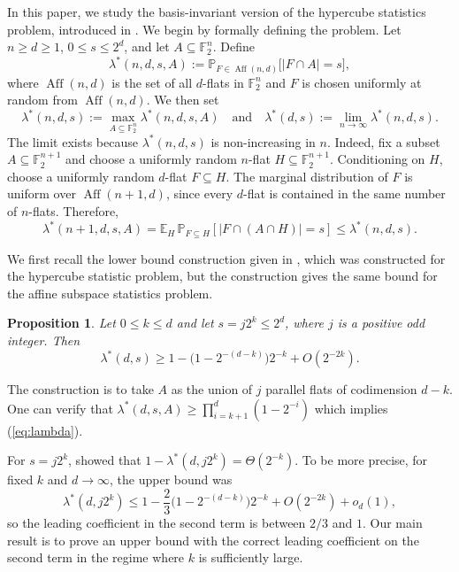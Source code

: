 \documentclass[reqno]{amsart}
\newtheorem{proposition}[theorem]{Proposition}
\theoremstyle{definition}
\theoremstyle{remark}
\newcommand{\F}{\mathbb F}
\newcommand{\E}{\mathbb E}
\renewcommand{\P}{\mathbb P}
\DeclareMathOperator{\Aff}{Aff}
\begin{document}
In this paper, we study the basis-invariant version of the hypercube statistics problem, introduced in \cite{Xu2026}. We begin by formally defining the problem. Let $n\ge d\ge1$, $0\le s\le2^d$, and
let $A\subseteq\F_2^n$. Define
\[\lambda^*(n,d,s,A):=\P_{F\in\Aff(n,d)}\bigl[|F\cap A|=s\bigr],\]
where $\Aff(n,d)$ is the set of all $d$-flats in $\F_2^{n}$ and $F$ is chosen uniformly at random from $\Aff(n,d)$. We then set
\[\lambda^*(n,d,s):=\max_{A\subseteq\F_2^n}\lambda^*(n,d,s,A)\quad\text{and}\quad \lambda^*(d,s):=\lim_{n\to\infty}\lambda^*(n,d,s).\]
The limit exists because $\lambda^*(n,d,s)$ is non-increasing in $n$. Indeed, fix a subset $A\subseteq\F_2^{n+1}$ and choose a uniformly random $n$-flat $H\subseteq\F_2^{n+1}$. Conditioning on $H$, choose a uniformly
random $d$-flat $F\subseteq H$. The marginal distribution of $F$ is uniform over $\Aff(n+1,d)$, since every $d$-flat is contained in the same
number of $n$-flats. Therefore,
\[\lambda^*(n+1,d,s,A)=\E_H\,\P_{F\subseteq H}[|F\cap(A\cap H)|=s]\le\lambda^*(n,d,s).\] 

We first recall the lower bound construction given in \cite{AlonAxenovichGoldwasser2024}, which was constructed for the hypercube statistic problem, but the construction gives the same bound for the affine subspace statistics problem. 

\begin{proposition}\label{prop:lower}
Let $0\le k\le d$ and let $s=j2^k\le2^d$, where $j$ is a positive odd
integer.  Then
\begin{equation}\label{eq:lambda}
  \lambda^*(d,s)\ge  1-\bigl(1-2^{-(d-k)}\bigr)2^{-k}+O(2^{-2k}).  
\end{equation}
\end{proposition}

The construction is to take $A$ as the union of $j$ parallel flats of codimension $d-k$. One can verify that $\lambda^*(d,s,A)\ge \prod_{i = k+1}^d(1-2^{-i})$ which implies (\ref{eq:lambda}).

For $s=j2^k$, \cite{Xu2026}
showed that $1-\lambda^*(d,j2^k)=\Theta(2^{-k})$. To be more precise, for fixed $k$ and $d\to\infty$, the upper bound was
\[
  \lambda^*(d,j2^k)\le 1-\frac23\bigl(1-2^{-(d-k)}\bigr)2^{-k}
  +O(2^{-2k})+o_d(1),
\]
so the leading coefficient in the second term is between
$2/3$ and $1$. Our main result is to prove an upper bound with the correct leading coefficient on the second term in the regime where $k$ is sufficiently large.

\end{document}
